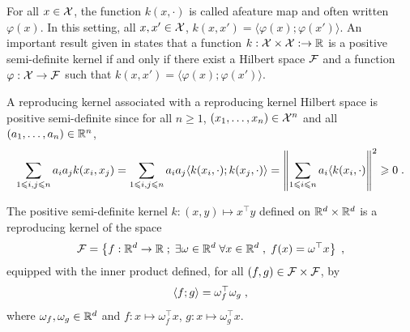 \begin{remark}
For all $x\in\mathcal{X}$, the function $k(x,\cdot)$ is called afeature map and often written $\varphi(x)$. In this setting, all $x,x'\in\mathcal{X}$, $k(x,x') = \langle \varphi(x); \varphi(x')\rangle$. An important result given in \cite{} states that  a function $k:\mathcal{X}\times\mathcal{X}:\to \mathbb{R}$ is a positive semi-definite kernel if and only if there exist a Hilbert space $\mathcal{F}$ and a function $\varphi: \mathcal{X}\to \mathcal{F}$ such that $k(x,x') = \langle \varphi(x); \varphi(x')\rangle$.
\end{remark}

A reproducing kernel associated with a reproducing kernel Hilbert space is positive semi-definite since for all $n\geqslant 1$, $(x_1,\ldots,x_n)\in\mathcal{X}^n$ and all $(a_1,\ldots,a_n)\in\mathbb{R}^n$,
\[
\sum_{1\leqslant i,j\leqslant n}a_ia_jk(x_i,x_j) = \sum_{1\leqslant i,j\leqslant n}a_ia_j \langle k(x_i,\cdot);k(x_j,\cdot)\rangle = \left\|\sum_{1\leqslant i\leqslant n}a_i\langle k(x_i,\cdot)\right\|^2 \geqslant 0\;.
\]

\begin{remark}
The positive semi-definite kernel $k:(x,y)\mapsto x^\top y$ defined on $\mathbb{R}^d\times\mathbb{R}^d$ is a reproducing kernel of the space
$$
\mathcal{F} = \left\{f: \mathbb{R}^d\to\mathbb{R}\;;\; \exists \omega\in\mathbb{R}^d \;\forall x\in \mathbb{R}^d\;, \; f(x) = \omega^\top x\right\}\;,
$$
equipped with the inner product defined, for all $(f,g)\in\mathcal{F}\times\mathcal{F}$, by 
$$
\langle f; g\rangle = \omega_f^\top \omega_g\;, 
$$
where $\omega_f,\omega_g\in\mathbb{R}^d$ and $f: x\mapsto \omega_f^\top x$, $g: x\mapsto \omega_g^\top x$. 
\end{remark}

